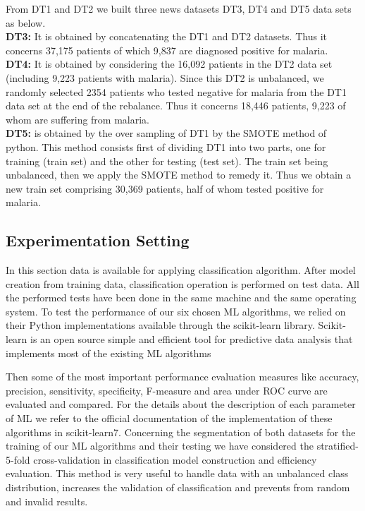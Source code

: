 From DT1 and DT2 we built three news datasets DT3, DT4 and DT5 data sets as below.\\
\textbf{DT3:}  It is obtained by concatenating the DT1 and DT2 datasets. Thus it concerns 37,175 patients of which 9,837 are diagnosed positive for malaria.\\
\textbf{DT4:} It is obtained by considering the 16,092 patients in the DT2 data set (including 9,223 patients with malaria). Since this DT2 is unbalanced, we randomly selected 2354 patients who tested negative for malaria from the DT1 data set at the end of the rebalance. Thus it concerns 18,446 patients, 9,223 of whom are suffering from malaria.\\
\textbf{DT5:} is obtained by the over sampling of DT1 by the SMOTE method of python. This method consists first of dividing DT1 into two parts, one for training (train set) and the other for testing (test set). The train set being unbalanced, then we apply the SMOTE method to remedy it. Thus we obtain a new train set comprising 30,369 patients, half of whom tested positive for malaria.

\subsection{Experimentation Setting}
In this section data is available for applying classification algorithm. After model creation from training data, classification operation is performed on test data. 
All the performed tests have been done in the same machine and the same operating system. To test the performance of our six chosen ML algorithms, we relied on their Python implementations available through the scikit-learn library. Scikit-learn is an open source simple and efficient tool for predictive data analysis that implements most of the existing ML algorithms

Then some of the most important performance evaluation measures like accuracy, precision, sensitivity, specificity, F-measure and area under ROC curve are evaluated and compared. 
For the details about the description of each parameter of ML we refer to the official documentation of the implementation of these algorithms in scikit-learn7. Concerning the segmentation of both datasets for the training of our ML algorithms and their testing we have considered the stratified-5-fold cross-validation in classification model construction and efficiency evaluation. This method is very useful to handle data with an unbalanced class distribution, increases the validation of classification and prevents from random and invalid results.



